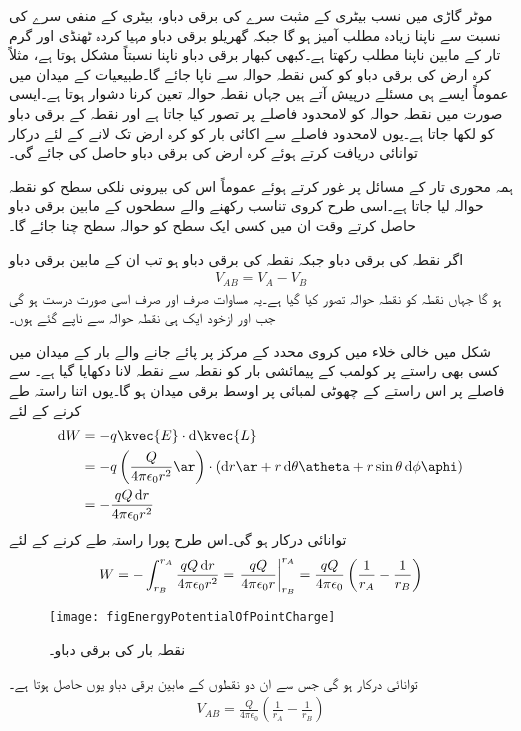 موٹر گاڑی میں نسب بیٹری کے مثبت سرے کی برقی دباو،  بیٹری کے منفی سرے کی نسبت سے ناپنا زیادہ مطلب آمیز ہو گا جبکہ گھریلو برقی دباو مہیا کردہ ٹھنڈی اور گرم تار کے مابین ناپنا مطلب رکھتا ہے۔کبھی کبھار برقی دباو ناپنا نسبتاً مشکل ہوتا ہے، مثلاً  کرہ ارض  کی برقی دباو کو کس نقطہ حوالہ سے ناپا جائے گا۔طبیعیات کے میدان میں عموماً ایسے ہی مسئلے درپیش آتے ہیں جہاں نقطہ حوالہ تعین کرنا دشوار ہوتا ہے۔ایسی صورت میں نقطہ حوالہ کو لامحدود فاصلے پر تصور کیا جاتا ہے اور نقطہ  کے برقی دباو کو  لکھا جاتا ہے۔یوں لامحدود فاصلے سے اکائی بار کو کرہ ارض تک لانے کے لئے درکار توانائی دریافت کرتے ہوئے کرہ ارض کی برقی دباو حاصل کی جائے گی۔

ہمہ محوری تار کے مسائل پر غور کرتے ہوئے عموماً اس کی بیرونی نلکی سطح کو نقطہ حوالہ لیا جاتا ہے۔اسی طرح کروی تناسب رکھنے والے سطحوں کے مابین برقی دباو حاصل کرتے وقت ان میں کسی ایک سطح کو حوالہ سطح چنا جائے گا۔

اگر نقطہ  کی برقی دباو  جبکہ نقطہ  کی برقی دباو  ہو تب ان کے مابین برقی دباو 
\begin{align}
V_{AB}=V_A-V_B
\end{align}
ہو گا جہاں نقطہ  کو نقطہ حوالہ تصور کیا گیا ہے۔یہ مساوات صرف اور صرف اسی صورت درست ہو گی جب  اور   ازخود  ایک ہی نقطہ حوالہ سے ناپے گئے ہوں۔

شکل   میں خالی خلاء میں کروی محدد کے مرکز پر پائے جانے والے بار  کے میدان میں کسی بھی راستے پر   کولمب  کے پیمائشی بار کو نقطہ  سے نقطہ  لانا دکھایا گیا ہے۔ سے  فاصلے پر اس راستے کے چھوٹی لمبائی  پر اوسط برقی میدان  ہو گا۔یوں اتنا راستہ طے کرنے کے لئے
\begin{align*}
\dif W&=- q \kvec{E} \cdot \dif \kvec{L}\\
&=-q \left(\frac{Q}{4\pi \epsilon_0 r^2}\ar \right) \cdot \left(\dif r \ar+r \dif \theta \atheta+r \sin \theta \dif \phi \aphi \right)\\
&=-\frac{q Q \dif r}{4 \pi \epsilon_0 r^2}
\end{align*}
توانائی درکار ہو گی۔اس طرح پورا راستہ طے کرنے کے لئے
\begin{align*}
W=-\int_{r_B}^{r_A} \frac{qQ \dif r}{4 \pi \epsilon_0 r^2}=\left. \frac{qQ}{4\pi \epsilon_0 r}\right|_{r_B}^{r_A}=\frac{qQ}{4\pi \epsilon_0} \left( \frac{1}{r_A}-\frac{1}{r_B} \right)
\end{align*}
%
\begin{figure}
\centering
\texttt{[image: figEnergyPotentialOfPointCharge]}
\caption{نقطہ بار کی برقی دباو۔}
\label{شکل_توانائی_نقطہ_بار_دباو}
\end{figure}
توانائی درکار ہو گی جس سے ان دو نقطوں کے مابین برقی دباو  یوں حاصل ہوتا ہے۔
\begin{align}\label{مساوات_توانائی_نقطہ_بار_کی_دباو}
V_{AB}=\frac{Q}{4\pi \epsilon_0} \left( \frac{1}{r_A}-\frac{1}{r_B} \right)
\end{align}

